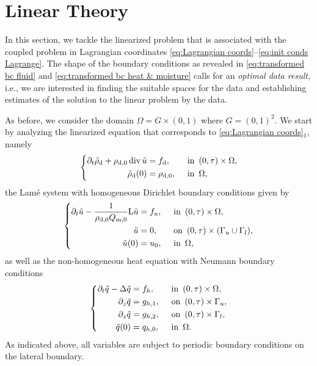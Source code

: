 \documentclass[10pt]{amsart}
\theoremstyle{plain}
\theoremstyle{definition}
\theoremstyle{thm}
\numberwithin{equation}{section}
\newcommand{\rL}{\mathrm{L}}
\DeclareMathOperator{\mdiv}{div}
\newcommand{\del}{\partial}
\newcommand{\dz}{\del_z}
\newcommand{\dt}{\del_t}
\newcommand{\Gal}{\Gamma_l}
\newcommand{\Gau}{\Gamma_u}
\newcommand{\ton}{\enspace \text{on} \enspace}
\newcommand{\tin}{\enspace \text{in} \enspace}
\newcommand{\rd}{\mathrm{d}}
\renewcommand{\rm}{\mathrm{m}}
\newcommand{\trho}{\Tilde{\rho}}
\newcommand{\tu}{\Tilde{u}}
\newcommand{\tq}{\Tilde{q}}
\begin{document}
\section{Linear Theory}\label{sec:lin theory}

In this section, we tackle the linearized problem that is associated with the coupled problem in Lagrangian coordinates \eqref{eq:Lagrangian coords}--\eqref{eq:init conds Lagrange}.
The shape of the boundary conditions as revealed in \eqref{eq:transformed bc fluid} and \eqref{eq:transformed bc heat & moisture} calls for an {\em optimal data result}, i.e., we are interested in finding the suitable spaces for the data and establishing estimates of the solution to the linear problem by the data.

As before, we consider the domain $\Omega= G \times (0,1)$ where $G = (0,1)^2$. 
We start by analyzing the linearized equation that corresponds to \eqref{eq:Lagrangian coords}$_1$, namely
\begin{equation}
	\left\{
	\begin{aligned}
        \dt \trho_\rd + \rho_{\rd,0} \mdiv \tu &=f_\rd, &&\tin (0,\tau) \times \Omega, \\
		  \trho_\rd(0)  &= \rho_{\rd,0}  , &&\tin \Omega,  
	\end{aligned}
	\right. 
	\label{eq:conteq3}
\end{equation}
the Lam\'{e} system with homogeneous Dirichlet boundary conditions given by
\begin{equation}
	\left\{
	\begin{aligned}
		\dt \tu - \frac{1}{\rho_{\rd,0} Q_{\rm,0}} \rL \tu &=  f_u, &&\tin (0,\tau) \times \Omega,  \\ 
         \tu 
         &= 0, &&\ton (0,\tau) \times (\Gau \cup \Gal),\\
        \tu(0)  
        &=u_0 ,  &&\tin \Omega,
	\end{aligned}
	\right. 
	\label{eq:Lame1}
\end{equation}
as well as the non-homogeneous heat equation with Neumann boundary conditions
\begin{equation}
	\left\{
	\begin{aligned}
		\dt \tq - \Delta \tq
        &=  f_h, &&\tin (0,\tau) \times \Omega,  \\
        \dz \tq   
        &= g_{h,1}  , &&\ton (0,\tau) \times \Gau, \\ 
		\dz \tq    
        &= g_{h,2}  , &&\ton (0,\tau) \times \Gal, \\ 
        \tq(0)  
        &= q_{h,0},  &&\tin \Omega.
	\end{aligned}
	\right. 
	\label{eq:Heat1}
\end{equation}
As indicated above, all variables are subject to periodic boundary conditions on the lateral boundary. 
\end{document}
